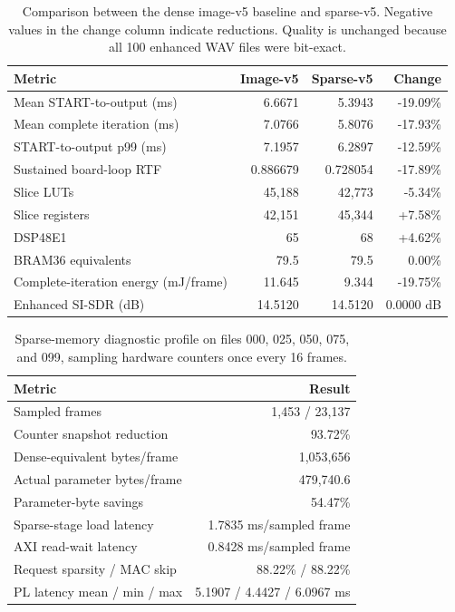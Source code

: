 \begin{table}[t]
  \centering
  \caption{Comparison between the dense image-v5 baseline and sparse-v5.
  Negative values in the change column indicate reductions. Quality is
  unchanged because all 100 enhanced WAV files were bit-exact.}
  \label{tab:sparse-v5-comparison}
  \begin{tabular}{@{}lrrr@{}}
    \toprule
    Metric & Image-v5 & Sparse-v5 & Change \\
    \midrule
    Mean START-to-output (ms) & 6.6671 & 5.3943 & -19.09\% \\
    Mean complete iteration (ms) & 7.0766 & 5.8076 & -17.93\% \\
    START-to-output p99 (ms) & 7.1957 & 6.2897 & -12.59\% \\
    Sustained board-loop RTF & 0.886679 & 0.728054 & -17.89\% \\
    Slice LUTs & 45,188 & 42,773 & -5.34\% \\
    Slice registers & 42,151 & 45,344 & +7.58\% \\
    DSP48E1 & 65 & 68 & +4.62\% \\
    BRAM36 equivalents & 79.5 & 79.5 & 0.00\% \\
    Complete-iteration energy (mJ/frame) & 11.645 & 9.344 & -19.75\% \\
    Enhanced SI-SDR (dB) & 14.5120 & 14.5120 & 0.0000 dB \\
    \bottomrule
  \end{tabular}
\end{table}

\begin{table}[t]
  \centering
  \caption{Sparse-memory diagnostic profile on files 000, 025, 050, 075, and
  099, sampling hardware counters once every 16 frames.}
  \label{tab:sparse-v5-diagnostics}
  \begin{tabular}{@{}lr@{}}
    \toprule
    Metric & Result \\
    \midrule
    Sampled frames & 1,453 / 23,137 \\
    Counter snapshot reduction & 93.72\% \\
    Dense-equivalent bytes/frame & 1,053,656 \\
    Actual parameter bytes/frame & 479,740.6 \\
    Parameter-byte savings & 54.47\% \\
    Sparse-stage load latency & 1.7835 ms/sampled frame \\
    AXI read-wait latency & 0.8428 ms/sampled frame \\
    Request sparsity / MAC skip & 88.22\% / 88.22\% \\
    PL latency mean / min / max & 5.1907 / 4.4427 / 6.0967 ms \\
    \bottomrule
  \end{tabular}
\end{table}
